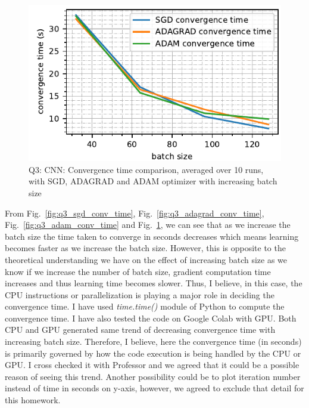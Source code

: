 \begin{figure}[!h]
	\centering
	\includegraphics[scale=1.0,trim={0cm 0cm 0cm 0cm},clip]{./code/colabPlots/q3_all_conv_time.pdf}
	\caption{Q3: CNN: Convergence time comparison, averaged over 10 runs, with SGD, ADAGRAD and ADAM optimizer with increasing batch size}
	\label{fig:q3_all_conv_time}
\end{figure}


From Fig.~\ref{fig:q3_sgd_conv_time}, Fig.~\ref{fig:q3_adagrad_conv_time}, Fig.~\ref{fig:q3_adam_conv_time} and Fig.~\ref{fig:q3_all_conv_time}, we can see that as we increase the batch size the time taken to converge in seconds decreases which means learning becomes faster as we increase the batch size. However, this is opposite to the theoretical understanding we have on the effect of increasing batch size as we know if we increase the number of batch size, gradient computation time increases and thus learning time becomes slower. Thus, I believe, in this case, the CPU instructions or parallelization is playing a major role in deciding the convergence time. I have used \textit{time.time()} module of Python to compute the convergence time. I have also tested the code on Google Colab with GPU. Both CPU and GPU generated same trend of decreasing convergence time with increasing batch size. Therefore, I believe, here the convergence time (in seconds) is primarily governed by how the code execution is being handled by the CPU or GPU. I cross checked it with Professor and we agreed that it could be a possible reason of seeing this trend. Another possibility could be to plot iteration number instead of time in seconds on y-axis, however, we agreed to exclude that detail for this homework.
\newpage
